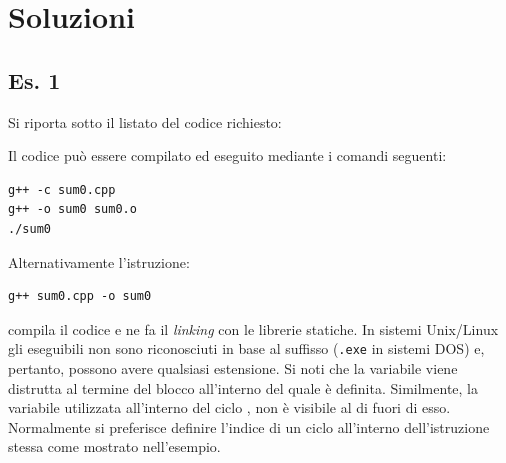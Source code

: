 \newpage

\section*{Soluzioni}

\subsection*{Es. 1}
Si riporta sotto il listato del codice richiesto:
%
\lstset{basicstyle=\scriptsize\sf}

\lstset{basicstyle=\sf}
%
Il codice pu\`o essere compilato ed eseguito mediante i comandi seguenti:
\begin{verbatim}
g++ -c sum0.cpp
g++ -o sum0 sum0.o
./sum0
\end{verbatim}
Alternativamente l'istruzione:
\begin{verbatim}
g++ sum0.cpp -o sum0
\end{verbatim}
compila il codice e ne fa il \emph{linking} con le librerie statiche.
In sistemi Unix/Linux gli eseguibili non sono riconosciuti in base al
suffisso (\texttt{.exe} in sistemi DOS) e, pertanto, possono avere
qualsiasi estensione.
Si noti che la variabile  viene distrutta al termine del
blocco  all'interno del quale \`e definita. Similmente, la
variabile  utilizzata all'interno del ciclo , non \`e
visibile al di fuori di esso. Normalmente si preferisce definire
l'indice di un ciclo  all'interno dell'istruzione stessa come
mostrato nell'esempio.

